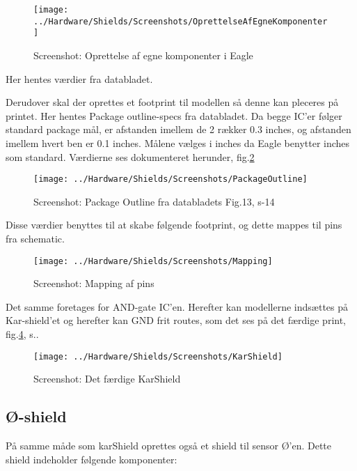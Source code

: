 \begin{figure}[H]
	\centering
	\texttt{[image: ../Hardware/Shields/Screenshots/OprettelseAfEgneKomponenter]}
	\caption{Screenshot: Oprettelse af egne komponenter i Eagle}
	\label{screenshot:EagleComponents}
\end{figure}

Her hentes værdier fra databladet.

Derudover skal der oprettes et footprint til modellen så denne kan pleceres på printet. Her hentes Package outline-specs fra databladet. Da begge IC'er følger standard package mål, er afstanden imellem de 2 rækker 0.3 inches, og afstanden imellem hvert ben er 0.1 inches. 
Målene vælges i inches da Eagle benytter inches som standard. Værdierne ses dokumenteret herunder, fig.\ref{screenshot:PackageOutline} 

\begin{figure}[H]
	\centering
	\texttt{[image: ../Hardware/Shields/Screenshots/PackageOutline]}
	\caption{Screenshot: Package Outline fra databladets Fig.13, s-14 }
	\label{screenshot:PackageOutline}
\end{figure}

	
Disse værdier benyttes til at skabe følgende footprint, og dette mappes til pins fra schematic. 

\begin{figure}[H]
	\centering
	\texttt{[image: ../Hardware/Shields/Screenshots/Mapping]}
	\caption{Screenshot: Mapping af pins}
	\label{screenshot:Mapping}
\end{figure}
	
Det samme foretages for AND-gate IC'en. 
Herefter kan modellerne indsættes på Kar-shield'et og herefter kan GND frit routes, som det ses på det færdige print, fig.\ref{screenshot:karShield}, s.\pageref{screenshot:karShield}.


\newpage
\begin{figure}[H]
	\centering
	\texttt{[image: ../Hardware/Shields/Screenshots/KarShield]}
	\caption{Screenshot: Det færdige KarShield}
	\label{screenshot:karShield}
\end{figure}



\newpage
\subsection{Ø-shield}

På samme måde som karShield oprettes også et shield til sensor Ø'en. Dette shield indeholder følgende komponenter: 

